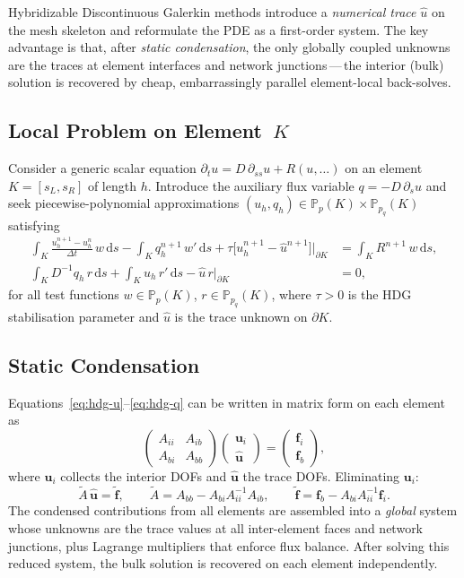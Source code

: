 \documentclass[11pt,a4paper]{article}
\begin{document}
Hybridizable Discontinuous Galerkin methods
\cite{cockburn2009unified,cockburn2016static}
introduce a \emph{numerical trace}
$\hat u$ on the mesh skeleton and reformulate the PDE as a first-order
system.  The key advantage is that, after \emph{static condensation},
the only globally coupled unknowns are the traces at element
interfaces and network junctions\,---\,the interior (bulk) solution
is recovered by cheap, embarrassingly parallel element-local
back-solves.

\subsection{Local Problem on Element~$K$}

Consider a generic scalar equation
$\partial_t u = D\,\partial_{ss}u + R(u,\dots)$ on an element
$K=[s_L,s_R]$ of length $h$.  Introduce the auxiliary flux variable
$q = -D\,\partial_s u$ and seek piecewise-polynomial approximations
$(u_h,q_h)\in\mathbb{P}_p(K)\times\mathbb{P}_{p_q}(K)$ satisfying
\begin{align}
  \int_K \frac{u_h^{n+1}-u_h^n}{\Delta t}\,w\,\mathrm{d}s
  - \int_K q_h^{n+1}\,w'\,\mathrm{d}s
  + \tau\bigl[u_h^{n+1}-\hat u^{n+1}\bigr]\Big|_{\partial K}
  &= \int_K R^{n+1}\,w\,\mathrm{d}s,
  \label{eq:hdg-u}\\[4pt]
  \int_K D^{-1}q_h\,r\,\mathrm{d}s
  + \int_K u_h\,r'\,\mathrm{d}s
  - \hat u\,r\Big|_{\partial K}
  &= 0,
  \label{eq:hdg-q}
\end{align}
for all test functions $w\in\mathbb{P}_p(K)$,
$r\in\mathbb{P}_{p_q}(K)$, where $\tau>0$ is the HDG
stabilisation parameter and $\hat u$ is the trace unknown on
$\partial K$.

\subsection{Static Condensation}

Equations~\eqref{eq:hdg-u}--\eqref{eq:hdg-q} can be written in
matrix form on each element as
\begin{equation}\label{eq:sc-block}
  \begin{pmatrix} A_{ii} & A_{ib} \\ A_{bi} & A_{bb}\end{pmatrix}
  \begin{pmatrix} \bm u_i \\ \hat{\bm u}\end{pmatrix}
  =
  \begin{pmatrix} \bm f_i \\ \bm f_b\end{pmatrix},
\end{equation}
where $\bm u_i$ collects the interior DOFs and $\hat{\bm u}$ the
trace DOFs.  Eliminating $\bm u_i$:
\[
  \widetilde A\,\hat{\bm u} = \widetilde{\bm f},
  \qquad
  \widetilde A = A_{bb}-A_{bi}A_{ii}^{-1}A_{ib},
  \qquad
  \widetilde{\bm f} = \bm f_b - A_{bi}A_{ii}^{-1}\bm f_i.
\]
The condensed contributions from all elements are assembled into a
\emph{global} system whose unknowns are the trace values at all
inter-element faces and network junctions, plus Lagrange multipliers
that enforce flux balance.  After solving this reduced system, the
bulk solution is recovered on each element independently.
\end{document}

